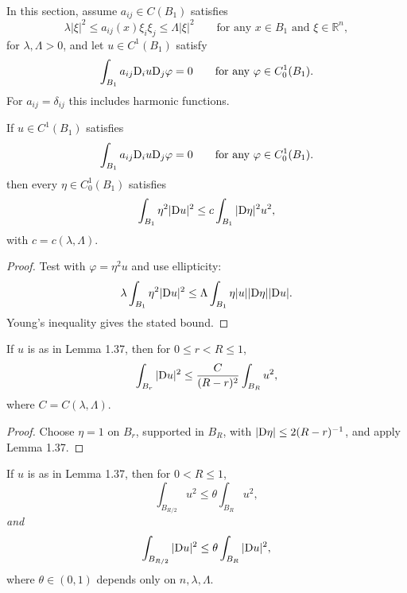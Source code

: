 In this section, assume $a_{ij}\in C(B_1)$ satisfies
\[
\lambda |\xi|^2 \le a_{ij}(x)\xi_i\xi_j \le \Lambda |\xi|^2\qquad \text{for any }x\in B_1\text{ and }\xi\in\mathbb{R}^n,
\]
for $\lambda,\Lambda>0$, and let $u\in C^1(B_1)$ satisfy
\[
\int_{B_1} a_{ij}\mathrm{D}_i u\mathrm{D}_j \varphi = 0\qquad \text{for any }\varphi\in C_0^1(B_1).
\]
For $a_{ij}=\delta_{ij}$ this includes harmonic functions.

\begin{lemma}\label{hanlin:lemma-caccioppoli}
If $u\in C^1(B_1)$ satisfies
\[
\int_{B_1} a_{ij}\mathrm{D}_i u\mathrm{D}_j \varphi = 0\qquad \text{for any }\varphi\in C_0^1(B_1).
\]
then every $\eta\in C_0^1(B_1)$ satisfies
\[
\int_{B_1} \eta^2|\mathrm{D} u|^2 \le c\int_{B_1} |\mathrm{D}\eta|^2 u^2,
\]
with $c=c(\lambda,\Lambda)$.
\end{lemma}

\begin{proof}
\sketch Test with $\varphi=\eta^2u$ and use ellipticity:
\[
\lambda \int_{B_1} \eta^2|\mathrm{D} u|^2 \le \Lambda \int_{B_1} \eta|u||\mathrm{D}\eta||\mathrm{D} u|.
\]
Young's inequality gives the stated bound.
\end{proof}

\begin{corollary}\label{hanlin:cor-caccioppoli-balls}
If $u$ is as in Lemma 1.37, then for $0\le r<R\le1$,
\[
\int_{B_r} |\mathrm{D} u|^2 \le \frac{C}{(R-r)^2}\int_{B_R} u^2,
\]
where $C=C(\lambda,\Lambda)$.
\end{corollary}

\begin{proof}
\sketch Choose $\eta=1$ on $B_r$, supported in $B_R$, with
$|\mathrm{D}\eta|\le2(R-r)^{-1}$, and apply Lemma 1.37.
\end{proof}

\begin{corollary}\label{hanlin:cor-energy-decay}
If $u$ is as in Lemma 1.37, then for $0<R\le1$,
\[
\int_{B_{R/2}} u^2 \le \theta \int_{B_R} u^2,
\]
\emph{and}
\[
\int_{B_{R/2}} |\mathrm{D} u|^2 \le \theta \int_{B_R} |\mathrm{D} u|^2,
\]
where $\theta\in(0,1)$ depends only on $n,\lambda,\Lambda$.
\end{corollary}

